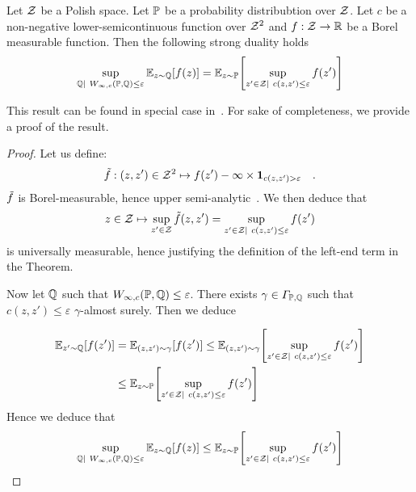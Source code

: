 \begin{thm}
Let $\mathcal{Z}$ be a Polish space. Let $\mathbb{P}$ be a probability distribubtion over $\mathcal{Z}$. Let $c$ be a non-negative lower-semicontinuous function over $\mathcal{Z}^2$ and $f:\mathcal{Z}\to \mathbb{R}$ be a Borel measurable function. Then the following strong duality holds
    \begin{align*}
        \sup_{\QQ|~W_{\infty,c}(\PP,\QQ)\leq \varepsilon}\mathbb{E}_{z\sim\QQ}\left[f(z)\right] = \mathbb{E}_{z\sim\PP}\left[\sup_{z'\in \ZZ|~c(z,z')\leq\varepsilon} f(z')\right]
    \end{align*}  
\end{thm}
This result can be found in special case in~\citep{pydi2019adversarial}. For sake of completeness, we provide a proof of the result. 
\begin{proof}
     Let us define:
     \begin{align*}
        \Tilde{f}:(z,z')\in\mathcal{Z}^2\mapsto f(z')-\infty\times\mathbf{1}_{c(z,z')>\varepsilon}\quad. 
     \end{align*}
     $\Tilde{f}$ is Borel-measurable, hence upper semi-analytic~\citep[Chapter 7]{bertsekas2004stochastic}. We then deduce that 
     \begin{align*}
       z\in\mathcal{Z}\mapsto \sup_{z'\in\mathcal{Z}} \Tilde{f}(z,z') = \sup_{z'\in \mathcal{Z}|~c(z,z')\leq\varepsilon} f(z')
     \end{align*}
     is universally measurable, hence justifying the definition of the left-end term in the Theorem. 

     Now let $\mathbb{Q}$ such that $W_{\infty,c}(\mathbb{P},\mathbb{Q})\leq \varepsilon$. There exists $\gamma\in\Gamma_{\mathbb{P},\mathbb{Q}}$ such that $c(z,z')\leq \varepsilon$ $\gamma$-almost surely. Then we deduce

     \begin{align*}
        \mathbb{E}_{z'\sim\QQ}\left[f(z')\right] &= \mathbb{E}_{(z,z')\sim\gamma}\left[f(z')\right]\leq\mathbb{E}_{(z,z')\sim\gamma}\left[\sup_{z'\in \ZZ|~c(z,z')\leq\varepsilon} f(z')\right] \\
       & \leq\mathbb{E}_{z\sim \PP}\left[\sup_{z'\in \ZZ|~c(z,z')\leq\varepsilon} f(z')\right]
      \end{align*}
      Hence we deduce that 
      \begin{align*}
        \sup_{\QQ|~W_{\infty,c}(\PP,\QQ)\leq \varepsilon}\mathbb{E}_{z\sim\QQ}\left[f(z)\right] \leq\mathbb{E}_{z\sim\PP}\left[\sup_{z'\in \ZZ|~c(z,z')\leq\varepsilon} f(z')\right]
      \end{align*}
     

\end{proof}
